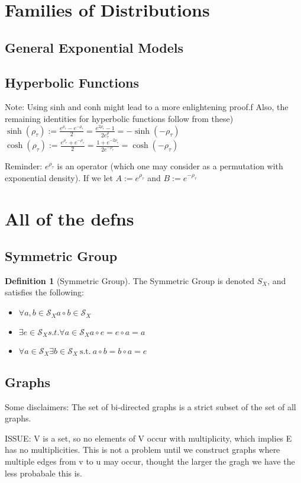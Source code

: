 \documentclass{article}
\theoremstyle{definition}
\newtheorem{definition}{Definition}
\begin{document}
\section{Families of Distributions}
\subsection{General Exponential Models}
\subsection{Hyperbolic Functions}
Note: Using sinh and conh might lead to a more enlightening proof.f
Also, the remaining identities for hyperbolic functions follow from these)
$\sinh(\rho_\tau) := \frac{e^{\rho_\tau} - e^{-\rho_\tau}}{2} = \frac{e^{2\rho_\tau} - 1}{2e^\rho_\tau} = -\sinh(-\rho_\tau)$
$\cosh(\rho_\tau) := \frac{e^{\rho_\tau} + e^{-\rho_\tau}}{2} = \frac{1+e^{-2\rho_\tau}}{2e^{-\rho_\tau}}= \cosh(-\rho_\tau)$

Reminder: $e^{\rho_\tau}$ is an operator (which one may consider as a permutation with exponential density). If we let $A := e^{\rho_\tau} $ and $B:= e^{-\rho_\tau}$

\section{All of the defns}
\subsection{Symmetric Group}
\begin{definition}[Symmetric Group] The Symmetric Group is denoted $S_X$, and satisfies the following:
\begin{itemize}
\item \( \forall a,b \in \mathcal{S}_X  a \circ b \in \mathcal{S}_X \)
\item \( \exists e \in \mathcal{S}_X s.t. \forall a \in \mathcal{S}_X a \circ e = e \circ a = a\)
\item \( \forall a \in \mathcal{S}_X \exists b \in \mathcal{S}_X \: \text{s.t.} \: a \circ b = b \circ a = e\)
\end{itemize}
\end{definition}

\subsection{Graphs}
Some disclaimers:
The set of bi-directed graphs is a strict subset of the set of all graphs. 

ISSUE: V is a set, so no elements of V occur with multiplicity, which implies E has no multiplicities. This is not a problem until we construct graphs where multiple edges from v to u may occur, thought the larger the gragh we have the less probabale this is.
\end{document}
